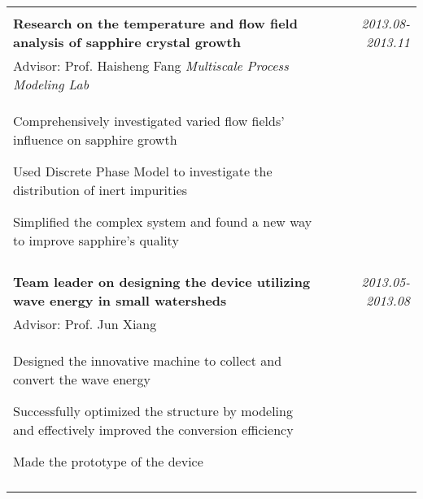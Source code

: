 \documentclass[a4paper,10pt]{article}
\begin{document}
\begin{tabular}{p{13.5cm}p{0.5cm}r}
\multicolumn{3}{c}{} \\
\textbf{Research on the temperature and flow field analysis of sapphire crystal growth}  && \emph{2013.08-2013.11} \\
\hspace{1em} Advisor: Prof. Haisheng Fang \hspace{6.7em} \emph{Multiscale Process Modeling Lab}  && \vspace{-0.5em} \\
\begin{compactitem}
       \item Comprehensively investigated varied flow fields' influence on sapphire growth\vspace{0.2em}
       \item Used Discrete Phase Model to investigate the distribution of inert impurities\vspace{0.2em}
       \item Simplified the complex system and found a new way to improve sapphire's quality %
     \end{compactitem}&&\vspace{-2.2em} \\
\multicolumn{3}{c}{} \\
 \textbf{Team leader on designing the device utilizing wave energy in small watersheds}&&  \emph{2013.05-2013.08} \\
\hspace{1em}  Advisor: Prof. Jun Xiang  & &\vspace{-0.5em}\\
\begin{compactitem}
       \item Designed the innovative machine to collect and convert the wave energy\vspace{0.2em}
       \item Successfully optimized the structure by modeling and effectively improved the conversion efficiency\vspace{0.2em}
       \item Made the prototype of the device
     \end{compactitem}&&\vspace{-1em} \\
\multicolumn{3}{c}{} \vspace{-1.5em} \\


\end{tabular}
\end{document}
